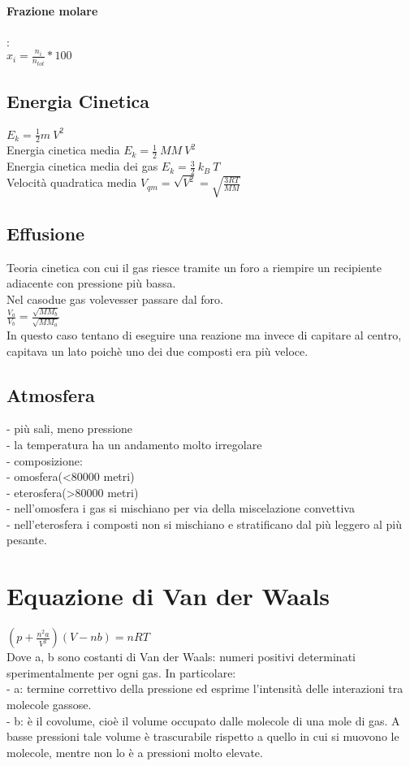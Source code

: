 \paragraph*{Frazione molare}:\\
$x_i = \frac{n_i}{n_{tot}} * 100$
\subsection{Energia Cinetica}
$E_k = \frac{1}{2}m\ V^2$\\
Energia cinetica media $E_k = \frac{1}{2}\ MM\ V^2$\\
Energia cinetica media dei gas $E_k = \frac{3}{2}\ k_B\ T$\\
Velocità quadratica media $V_{qm} = \sqrt{V^2} = \sqrt{\frac{3RT}{MM}}$\\ 
\subsection{Effusione} 
Teoria cinetica con cui il gas riesce tramite un foro a riempire un recipiente adiacente con pressione più bassa.\\
Nel casodue gas volevesser passare dal foro.\\
$\frac{V_a}{V_b}=\frac{\sqrt{MM_b}}{\sqrt{MM_a}}$\\
In questo caso tentano di eseguire una reazione ma invece di capitare al centro, capitava un lato poichè uno dei due composti era più veloce.
\subsection{Atmosfera}
\tab- più sali, meno pressione\\
\tab- la temperatura ha un andamento molto irregolare\\
\tab- composizione:\\
\tab\tab- omosfera(<80000 metri)\\
\tab\tab- eterosfera(>80000 metri)\\
\tab\tab- nell'omosfera i gas si mischiano per via della miscelazione convettiva\\
\tab\tab- nell'eterosfera i composti non si mischiano e stratificano dal più leggero al più pesante.\\
\section{Equazione di Van der Waals}
$\left(p+\frac{n^2a}{V^2}\right)\left(V-nb\right) = nRT$\\
Dove a, b sono costanti di Van der Waals: numeri positivi determinati sperimentalmente per ogni gas. In particolare:\\
\tab- a: termine correttivo della pressione ed esprime l'intensità delle interazioni tra molecole gassose.\\
\tab- b: è il covolume, cioè il volume occupato dalle molecole di una mole di gas. A basse pressioni tale volume è trascurabile rispetto a quello in cui si muovono le molecole, mentre non lo è a pressioni molto elevate.
